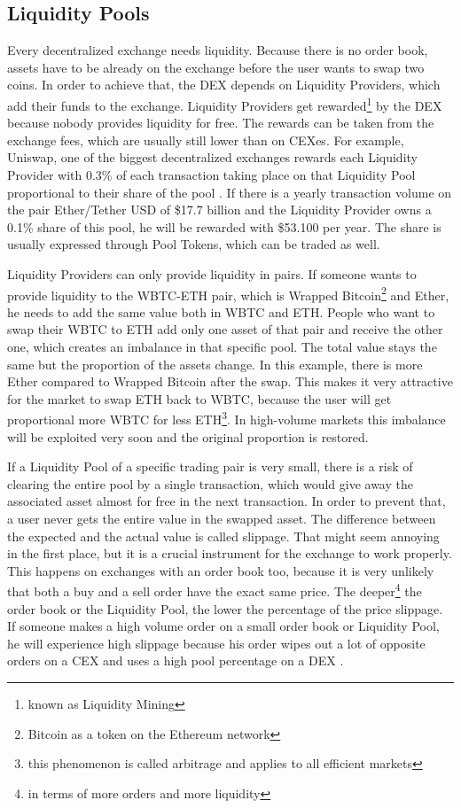 \subsection{Liquidity Pools}
Every decentralized exchange needs liquidity. Because there is no order book, assets have to be already on the exchange before the user wants to swap two coins. In order to achieve that, the DEX depends on Liquidity Providers, which add their funds to the exchange. Liquidity Providers get rewarded\footnote{known as Liquidity Mining} by the DEX because nobody provides liquidity for free. The rewards can be taken from the exchange fees, which are usually still lower than on CEXes. For example, Uniswap, one of the biggest decentralized exchanges rewards each Liquidity Provider with 0.3\% of each transaction taking place on that Liquidity Pool proportional to their share of the pool \cite{Uniswap2020}. If there is a yearly transaction volume on the pair Ether/Tether USD of \$17.7 billion and the Liquidity Provider owns a 0.1\% share of this pool, he will be rewarded with \$53.100 per year. The share is usually expressed through Pool Tokens, which can be traded as well.

Liquidity Providers can only provide liquidity in pairs. If someone wants to provide liquidity to the WBTC-ETH pair, which is Wrapped Bitcoin\footnote{Bitcoin as a token on the Ethereum network} and Ether, he needs to add the same value both in WBTC and ETH. People who want to swap their WBTC to ETH add only one asset of that pair and receive the other one, which creates an imbalance in that specific pool. The total value stays the same but the proportion of the assets change. In this example, there is more Ether compared to Wrapped Bitcoin after the swap. This makes it very attractive for the market to swap ETH back to WBTC, because the user will get proportional more WBTC for less ETH\footnote{this phenomenon is called arbitrage and applies to all efficient markets}. In high-volume markets this imbalance will be exploited very soon and the original proportion is restored.

If a Liquidity Pool of a specific trading pair is very small, there is a risk of clearing the entire pool by a single transaction, which would give away the associated asset almost for free in the next transaction. In order to prevent that, a user never gets the entire value in the swapped asset. The difference between the expected and the actual value is called slippage. That might seem annoying in the first place, but it is a crucial instrument for the exchange to work properly. This happens on exchanges with an order book too, because it is very unlikely that both a buy and a sell order have the exact same price. The deeper\footnote{in terms of more orders and more liquidity} the order book or the Liquidity Pool, the lower the percentage of the price slippage. If someone makes a high volume order on a small order book or Liquidity Pool, he will experience high slippage because his order wipes out a lot of opposite orders on a CEX and uses a high pool percentage on a DEX \cite{Hosp2020}.

